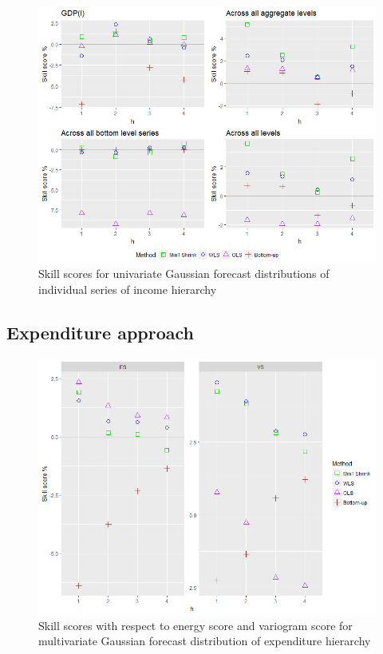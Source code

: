 \documentclass[graybox]{svmult}
\begin{document}
\begin{figure}[H]
	\centering
	\small
	\includegraphics[scale=0.50]{Figs/Results/INC-ProbGaussF-UnivS_CRPS.png}
	\caption{Skill scores for univariate Gaussian forecast distributions of individual series of income hierarchy}\label{Inc_ProbGaus_UnivS}
\end{figure}


\subsection*{Expenditure approach}

\begin{figure}[H]
	\centering
	\small
	\includegraphics[scale=0.50]{Figs/Results/EXP-ProbGaussF-MultivS_ES_VS.png}
	\caption{Skill scores with respect to energy score and variogram score for multivariate Gaussian forecast distribution of expenditure hierarchy}\label{Exp_ProbGaus_ES_VS}
\end{figure}
\end{document}
